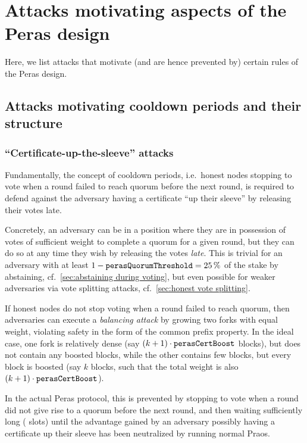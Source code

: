 \section{Attacks motivating aspects of the Peras design}

Here, we list attacks that motivate (and are hence prevented by) certain rules of the Peras design.

\subsection{Attacks motivating cooldown periods and their structure}\label{sec:attack cooldowns}

\subsubsection{\enquote{Certificate-up-the-sleeve} attacks}

Fundamentally, the concept of cooldown periods, i.e.\ honest nodes stopping to vote when a round failed to reach quorum before the next round, is required to defend against the adversary having a certificate \enquote{up their sleeve} by releasing their votes late.

Concretely, an adversary can be in a position where they are in possession of votes of sufficient weight to complete a quorum for a given round, but they can do so at any time they wish by releasing the votes \emph{late}.
This is trivial for an adversary with at least $1-\mathtt{perasQuorumThreshold} = \qty{25}{\percent}$ of the stake by abstaining, cf.~\cref{sec:abstaining during voting}, but even possible for weaker adversaries via vote splitting attacks, cf.~\cref{sec:honest vote splitting}.

If honest nodes do not stop voting when a round failed to reach quorum, then adversaries can execute a \emph{balancing attack} by growing two forks with equal weight, violating safety in the form of the common prefix property.
In the ideal case, one fork is relatively dense (say $(k+1) \cdot \mathtt{perasCertBoost}$ blocks), but does not contain any boosted blocks, while the other contains few blocks, but every block is boosted (say $k$ blocks, such that the total weight is also $(k+1)\cdot\mathtt{perasCertBoost}$).

\medskip
In the actual Peras protocol, this is prevented by stopping to vote when a round did not give rise to a quorum before the next round, and then waiting sufficiently long (\Theal{} slots) until the advantage gained by an adversary possibly having a certificate up their sleeve has been neutralized by running normal Praos.

